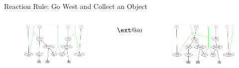 \documentclass{beamer}
\makeatletter
\providecommand\longrightarrowRHD{\relbar\joinrel\relbar\joinrel\mathrel\RHD}
\providecommand*\xrightarrowRHD[2][]{\ext@arrow 0055{\arrowfill@\relbar\relbar\longrightarrowRHD}{#1}{#2}}
\makeatother
\begin{document}
\begin{frame}{Reaction Rule: Go West and Collect an Object}
  \begin{columns}
    \begin{column}{0.45\textwidth}
      \begin{figure}
        \centering
        \includegraphics[width=\textwidth]{../models/agent1/westObject_lhs.pdf}
      \end{figure}
    \end{column}
    \begin{column}{0.1\textwidth}
      $\xrightarrowRHD{p}$
    \end{column}
    \begin{column}{0.45\textwidth}
      \begin{figure}
        \centering
        \includegraphics[width=\textwidth]{../models/agent1/westObject_rhs.pdf}
      \end{figure}
    \end{column}
  \end{columns}
\end{frame}
\end{document}
